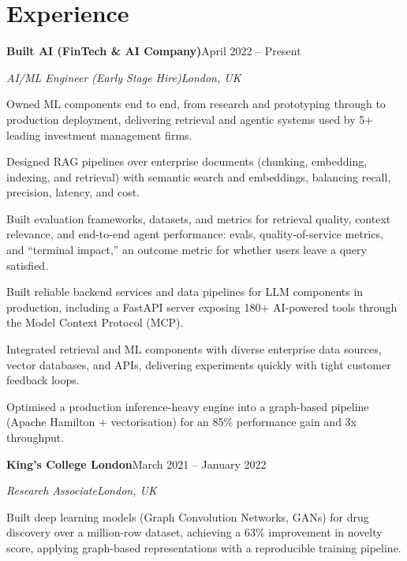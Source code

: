 \documentclass[10pt,a4paper]{article}
\newcommand{\entry}[4]{%
  {\color{company}\bfseries #1}\hfill {\color{muted}#2}\par
  \vspace{1pt}
  {\itshape #3}\hfill {\color{muted}\itshape #4}\par
  \vspace{3pt}%
}
\begin{document}
\section{Experience}
\entry{Built AI (FinTech \& AI Company)}{April 2022 -- Present}{AI/ML Engineer (Early Stage Hire)}{London, UK}
\begin{tight}
  \item Owned ML components end to end, from research and prototyping through to production deployment, delivering retrieval and agentic systems used by 5+ leading investment management firms.
  \item Designed RAG pipelines over enterprise documents (chunking, embedding, indexing, and retrieval) with semantic search and embeddings, balancing recall, precision, latency, and cost.
  \item Built evaluation frameworks, datasets, and metrics for retrieval quality, context relevance, and end-to-end agent performance: evals, quality-of-service metrics, and ``terminal impact,'' an outcome metric for whether users leave a query satisfied.
  \item Built reliable backend services and data pipelines for LLM components in production, including a FastAPI server exposing 180+ AI-powered tools through the Model Context Protocol (MCP).
  \item Integrated retrieval and ML components with diverse enterprise data sources, vector databases, and APIs, delivering experiments quickly with tight customer feedback loops.
  \item Optimised a production inference-heavy engine into a graph-based pipeline (Apache Hamilton + vectorisation) for an 85\% performance gain and 3x throughput.
\end{tight}

\entry{King's College London}{March 2021 -- January 2022}{Research Associate}{London, UK}
\begin{tight}
  \item Built deep learning models (Graph Convolution Networks, GANs) for drug discovery over a million-row dataset, achieving a 63\% improvement in novelty score, applying graph-based representations with a reproducible training pipeline.
\end{tight}

\end{document}
